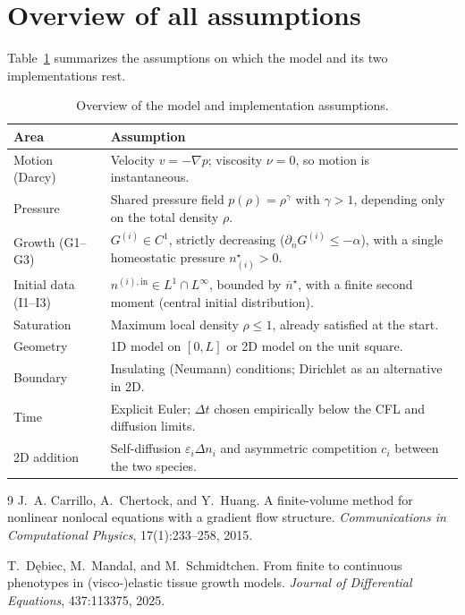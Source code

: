 \documentclass[11pt]{article}
\newcommand{\nin}{n^{(i),\mathrm{in}}}
\newcommand{\nbar}{\overline{n}}
\begin{document}
\section{Overview of all assumptions}
\label{sec:overview}
Table~\ref{tab:assumptions} summarizes the assumptions on which the model and its
two implementations rest.

\begin{table}[htbp]
    \centering
    \begin{tabular}{@{}p{4.2cm}p{10.3cm}@{}}
        \toprule
        \textbf{Area} & \textbf{Assumption} \\
        \midrule
        Motion (Darcy) & Velocity $v = -\nabla p$; viscosity $\nu = 0$, so motion
        is instantaneous. \\
        Pressure & Shared pressure field $p(\rho) = \rho^\gamma$ with $\gamma > 1$,
        depending only on the total density $\rho$. \\
        Growth (G1--G3) & $G^{(i)} \in C^1$, strictly decreasing
        ($\partial_{\nbar} G^{(i)} \le -\alpha$), with a single homeostatic
        pressure $n^{\star}_{(i)} > 0$. \\
        Initial data (I1--I3) & $\nin \in L^1 \cap L^\infty$, bounded by
        $\nbar^{\star}$, with a finite second moment (central initial
        distribution). \\
        Saturation & Maximum local density $\rho \le 1$, already satisfied at the
        start. \\
        Geometry & 1D model on $[0, L]$ or 2D model on the unit square. \\
        Boundary & Insulating (Neumann) conditions; Dirichlet as an alternative in
        2D. \\
        Time & Explicit Euler; $\Delta t$ chosen empirically below the CFL and
        diffusion limits. \\
        2D addition & Self-diffusion $\varepsilon_i \Delta n_i$ and asymmetric
        competition $c_i$ between the two species. \\
        \bottomrule
    \end{tabular}
    \caption{Overview of the model and implementation assumptions.}
    \label{tab:assumptions}
\end{table}

\begin{thebibliography}{9}
J.~A. Carrillo, A.~Chertock, and Y.~Huang.
\newblock A finite-volume method for nonlinear nonlocal equations with a gradient
flow structure.
\newblock \emph{Communications in Computational Physics}, 17(1):233--258, 2015.

T.~Dębiec, M.~Mandal, and M.~Schmidtchen.
\newblock From finite to continuous phenotypes in (visco-)elastic tissue growth
models.
\newblock \emph{Journal of Differential Equations}, 437:113375, 2025.
\end{thebibliography}
\end{document}

